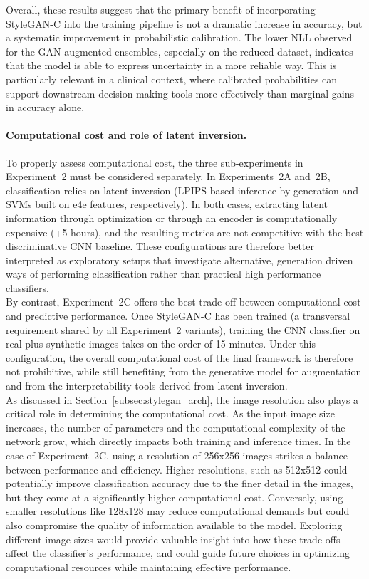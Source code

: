 Overall, these results suggest that the primary benefit of incorporating StyleGAN-C into the training pipeline is not a dramatic increase in accuracy, but a systematic improvement in probabilistic calibration. The lower NLL observed for the GAN-augmented ensembles, especially on the reduced dataset, indicates that the model is able to express uncertainty in a more reliable way. This is particularly relevant in a clinical context, where calibrated probabilities can support downstream decision-making tools more effectively than marginal gains in accuracy alone.

\paragraph{Computational cost and role of latent inversion.}
To properly assess computational cost, the three sub-experiments in Experiment~2 must be considered separately. In Experiments~2A and~2B, classification relies on latent inversion (LPIPS based inference by generation and SVMs built on e4e features, respectively). In both cases, extracting latent information through optimization or through an encoder is computationally expensive (+5 hours), and the resulting metrics are not competitive with the best discriminative CNN baseline. These configurations are therefore better interpreted as exploratory setups that investigate alternative, generation driven ways of performing classification rather than practical high performance classifiers. \\

By contrast, Experiment~2C offers the best trade-off between computational cost and predictive performance. Once StyleGAN-C has been trained (a transversal requirement shared by all Experiment~2 variants), training the CNN classifier on real plus synthetic images takes on the order of 15 minutes. Under this configuration, the overall computational cost of the final framework is therefore not prohibitive, while still benefiting from the generative model for augmentation and from the interpretability tools derived from latent inversion.\\

As discussed in Section~\ref{subsec:stylegan_arch}, the image resolution also plays a critical role in determining the computational cost. As the input image size increases, the number of parameters and the computational complexity of the network grow, which directly impacts both training and inference times. In the case of Experiment~2C, using a resolution of 256x256 images strikes a balance between performance and efficiency. Higher resolutions, such as 512x512 could potentially improve classification accuracy due to the finer detail in the images, but they come at a significantly higher computational cost. Conversely, using smaller resolutions like 128x128 may reduce computational demands but could also compromise the quality of information available to the model. Exploring different image sizes would provide valuable insight into how these trade-offs affect the classifier’s performance, and could guide future choices in optimizing computational resources while maintaining effective performance. 


